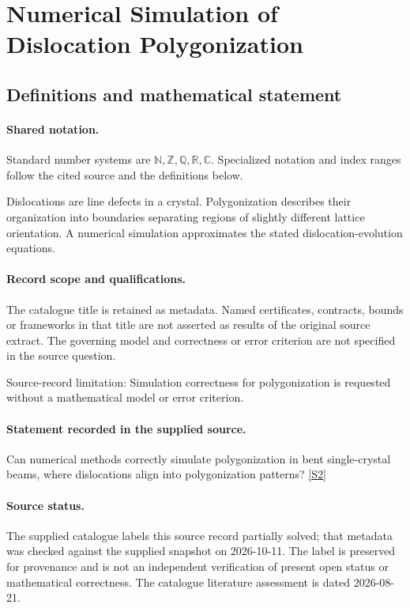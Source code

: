 \documentclass[11pt]{article}
\newcommand{\sref}[2]{\hyperlink{source:#1:#2}{[S#2]}}
\begin{document}
\section{Numerical Simulation of Dislocation Polygonization}\label{statement}

\subsection{Definitions and mathematical statement}

\paragraph{Shared notation.}Standard number systems are $\mathbb N,\mathbb Z,\mathbb Q,\mathbb R,\mathbb C$. Specialized notation and index ranges follow the cited source and the definitions below.


Dislocations are line defects in a crystal. Polygonization describes their organization into boundaries separating regions of slightly different lattice orientation. A numerical simulation approximates the stated dislocation-evolution equations.
\paragraph{Record scope and qualifications.}
The catalogue title is retained as metadata. Named certificates, contracts, bounds or frameworks in that title are not asserted as results of the original source extract.
The governing model and correctness or error criterion are not specified in the source question.

Source-record limitation: Simulation correctness for polygonization is requested without a mathematical model or error criterion.
\paragraph{Statement recorded in the supplied source.}
Can numerical methods correctly simulate polygonization in bent single-crystal beams, where dislocations align into polygonization patterns? \sref{statement}{2}
\paragraph{Source status.}
The supplied catalogue labels this source record partially solved; that metadata was checked against the supplied snapshot on 2026-10-11. The label is preserved for provenance and is not an independent verification of present open status or mathematical correctness. The catalogue literature assessment is dated 2026-08-21.
\end{document}
